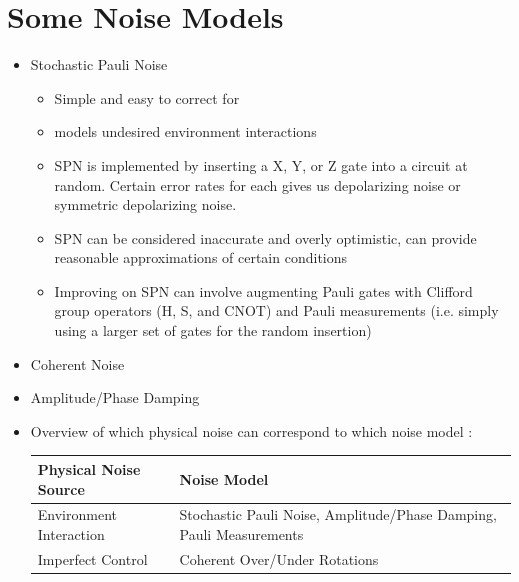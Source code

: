 \documentclass [12pt]{article}
\begin{document}
    \section{Some Noise Models}
        \begin{itemize}
            \item Stochastic Pauli Noise 
                \begin{itemize}
                    \item Simple and easy to correct for \cite{wallman16}
                    \item models undesired environment interactions
                    \item SPN is implemented by inserting a X, Y, or Z gate into a circuit at random. Certain error rates for each gives us depolarizing noise or symmetric depolarizing noise. 
                    \item SPN can be considered inaccurate and overly optimistic, can provide reasonable approximations of certain conditions \cite{resch21}
                    \item Improving on SPN can involve augmenting Pauli gates with Clifford group operators (H, S, and CNOT) and Pauli measurements (i.e. simply using a larger set of gates for the random insertion)
                \end{itemize}

            \item Coherent Noise 
            \item Amplitude/Phase Damping 
            \item Overview of which physical noise can correspond to which noise model \cite{resch21}: 
            
                \begin{center}
                    \begin{tabular}{p{5cm}|p{7cm}}
                        \hline 
                        Physical Noise Source & Noise Model \\ 
                        \hline 
                        \hline
                        Environment Interaction & Stochastic Pauli Noise, Amplitude/Phase Damping, Pauli Measurements \\ 
                        \hline
                        Imperfect Control & Coherent Over/Under Rotations \\ 
                        \hline
                    \end{tabular}
                \end{center}
        \end{itemize}
\end{document}
